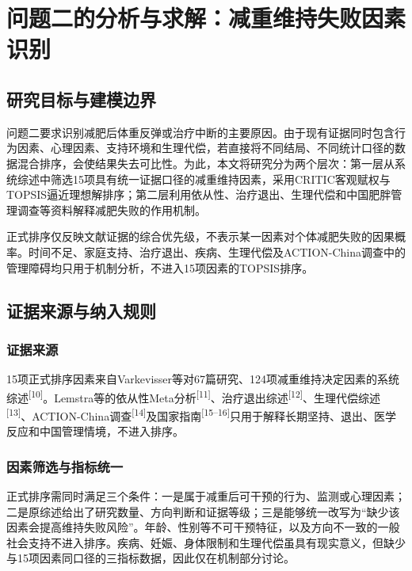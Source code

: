 \section{问题二的分析与求解：减重维持失败因素识别}

\subsection{研究目标与建模边界}

问题二要求识别减肥后体重反弹或治疗中断的主要原因。由于现有证据同时包含行为因素、心理因素、支持环境和生理代偿，若直接将不同结局、不同统计口径的数据混合排序，会使结果失去可比性。为此，本文将研究分为两个层次：第一层从系统综述中筛选15项具有统一证据口径的减重维持因素，采用CRITIC客观赋权与TOPSIS逼近理想解排序；第二层利用依从性、治疗退出、生理代偿和中国肥胖管理调查等资料解释减肥失败的作用机制。

正式排序仅反映文献证据的综合优先级，不表示某一因素对个体减肥失败的因果概率。时间不足、家庭支持、治疗退出、疾病、生理代偿及ACTION-China调查中的管理障碍均只用于机制分析，不进入15项因素的TOPSIS排序。

\subsection{证据来源与纳入规则}

\subsubsection{证据来源}

15项正式排序因素来自Varkevisser等对67篇研究、124项减重维持决定因素的系统综述\textsuperscript{[10]}。Lemstra等的依从性Meta分析\textsuperscript{[11]}、治疗退出综述\textsuperscript{[12]}、生理代偿综述\textsuperscript{[13]}、ACTION-China调查\textsuperscript{[14]}及国家指南\textsuperscript{[15--16]}只用于解释长期坚持、退出、医学反应和中国管理情境，不进入排序。

\subsubsection{因素筛选与指标统一}

正式排序需同时满足三个条件：一是属于减重后可干预的行为、监测或心理因素；二是原综述给出了研究数量、方向判断和证据等级；三是能够统一改写为“缺少该因素会提高维持失败风险”。年龄、性别等不可干预特征，以及方向不一致的一般社会支持不进入排序。疾病、妊娠、身体限制和生理代偿虽具有现实意义，但缺少与15项因素同口径的三指标数据，因此仅在机制部分讨论。


